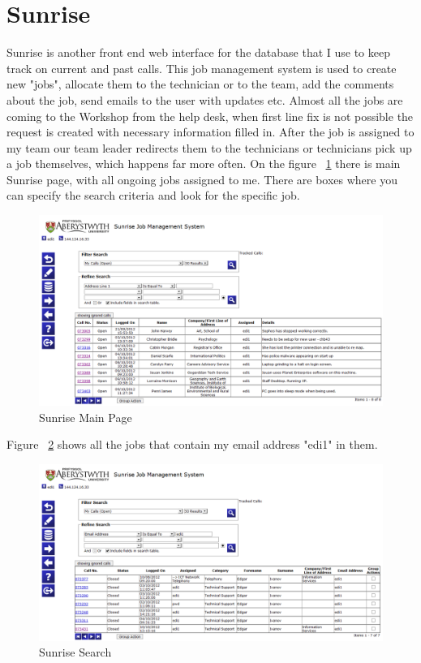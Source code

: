 \documentclass[10pt,a4paper,headinclude=true]{report}
\begin{document}
\section{Sunrise}
Sunrise is another front end web interface for the database that I use to keep track on current and past calls. This job management system is used to create new "jobs", allocate them to the technician or to the team, add the comments about the job, send emails to the user with updates etc. Almost all the jobs are coming to the Workshop from the help desk, when first line fix is not possible the request is created with necessary information filled in. After the job is assigned to my team our team leader redirects them to the technicians or technicians pick up a job themselves, which happens far more often. On the figure ~\ref{fig:sunrise_main} there is main Sunrise page, with all ongoing jobs assigned to me. There are boxes where you can specify the search criteria and look for the specific job.

\begin{figure}[H]
\centering
\centerline{\includegraphics[scale=0.5]{./sunrise_main}}
\caption{Sunrise Main Page}
\label{fig:sunrise_main}
\end{figure}

Figure ~\ref{fig:sunrise_search} shows all the jobs that contain my email address "edi1" in them.

\begin{figure}[H]
\centering
\centerline{\includegraphics[scale=0.4]{./sunrise_search}}
\caption{Sunrise Search}
\label{fig:sunrise_search}
\end{figure}
\end{document}
